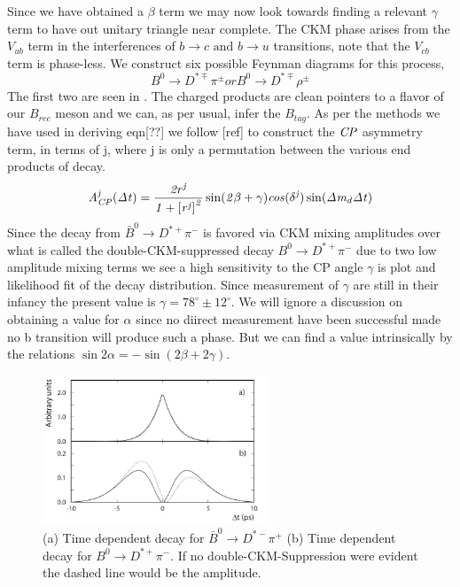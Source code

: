 \documentclass[floatfix,aps,prd,amsmath,amssymb]{revtex4}
\begin{document}
Since we have obtained a $\beta$ term we may now look towards finding a relevant $\gamma$ term to have out unitary triangle near complete. The CKM phase arises from the $V_{ub}$ term in the interferences of $b\rightarrow c \mbox{ and } b \rightarrow u$ transitions, note that the $V_{cb}$ term is phase-less. We construct six possible Feynman diagrams for this process,
\[B^0 \rightarrow D^{*\mp}\pi^{\pm} or B^0 \rightarrow D^{*\mp}\rho^{\pm} \]
The first two are seen in \label{pBGD}. The charged products are clean pointers to a flavor of our $B_{rec}$ meson and we can, as per usual, infer the $B_{tag}$. As per the methods we have used in deriving eqn[??] we follow [ref] to construct the $\it{CP}$ asymmetry term, in terms of j, where j is only a permutation between the various end products of decay.
\[\it{A}^{j}_{\it{CP}}(\Delta t) = \frac{2r^j}{1+\left[r^j\right]^2}\sin(2 \beta +\gamma)cos(\delta^j)\sin(\Delta m_d \Delta t)\]
Since the decay from $\bar{B}^0 \rightarrow D^{*+}\pi^{-}$ is favored via CKM mixing amplitudes over what is called the double-CKM-suppressed decay $B^0 \rightarrow D^{*+}\pi^{-}$ due to two low amplitude mixing terms we see a high sensitivity to the CP angle $\gamma$  \label{kino1} is plot and likelihood fit of the decay distribution. Since measurement of $\gamma$ are still in their infancy the present value is $\gamma = 78^{\circ}\pm12^{\circ}$. We will ignore a discussion on obtaining a value for $\alpha$ since no diirect measurement have been successful made no b transition will produce such a phase. But we can find a value intrinsically by the relations $\sin2\alpha = - \sin(2\beta +2\gamma)$.

 \begin{figure}[h]
\centering
\includegraphics[width=0.6\textwidth]{figs/kino.jpg}
\caption{(a) Time dependent decay for $\bar{B}^0 \rightarrow D^{*-}\pi^{+}$ (b) Time dependent decay for $B^0 \rightarrow D^{*+}\pi^{-}$. If no double-CKM-Suppression were evident the dashed line would be the amplitude.}
\label{kino1}
\end{figure}
\end{document}
